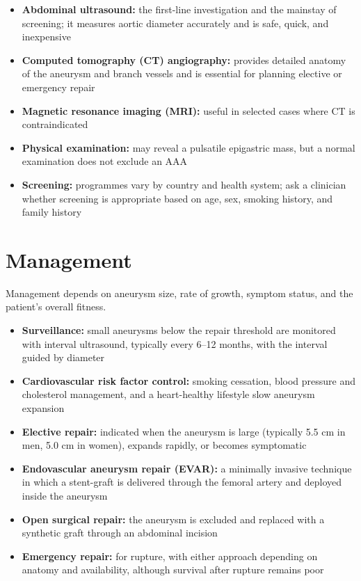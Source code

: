 \begin{itemize}
    \item \textbf{Abdominal ultrasound:} the first-line investigation and the mainstay of screening; it measures aortic diameter accurately and is safe, quick, and inexpensive
    \item \textbf{Computed tomography (CT) angiography:} provides detailed anatomy of the aneurysm and branch vessels and is essential for planning elective or emergency repair
    \item \textbf{Magnetic resonance imaging (MRI):} useful in selected cases where CT is contraindicated
    \item \textbf{Physical examination:} may reveal a pulsatile epigastric mass, but a normal examination does not exclude an AAA
    \item \textbf{Screening:} programmes vary by country and health system; ask a clinician whether screening is appropriate based on age, sex, smoking history, and family history
\end{itemize}

\section*{Management}
Management depends on aneurysm size, rate of growth, symptom status, and the patient's overall fitness.

\begin{itemize}
    \item \textbf{Surveillance:} small aneurysms below the repair threshold are monitored with interval ultrasound, typically every 6--12 months, with the interval guided by diameter
    \item \textbf{Cardiovascular risk factor control:} smoking cessation, blood pressure and cholesterol management, and a heart-healthy lifestyle slow aneurysm expansion
    \item \textbf{Elective repair:} indicated when the aneurysm is large (typically 5.5 cm in men, 5.0 cm in women), expands rapidly, or becomes symptomatic
    \item \textbf{Endovascular aneurysm repair (EVAR):} a minimally invasive technique in which a stent-graft is delivered through the femoral artery and deployed inside the aneurysm
    \item \textbf{Open surgical repair:} the aneurysm is excluded and replaced with a synthetic graft through an abdominal incision
    \item \textbf{Emergency repair:} for rupture, with either approach depending on anatomy and availability, although survival after rupture remains poor
\end{itemize}

